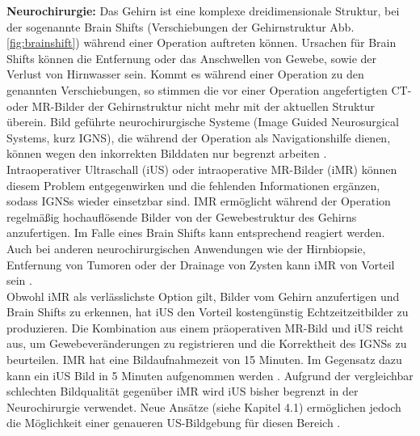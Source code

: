 \textbf{Neurochirurgie:}
Das Gehirn ist eine komplexe dreidimensionale Struktur, bei der sogenannte Brain Shifts (Verschiebungen der Gehirnstruktur Abb. \ref{fig:brainshift}) während einer Operation auftreten können. Ursachen für Brain Shifts können die Entfernung oder das Anschwellen von Gewebe, sowie der Verlust von Hirnwasser sein. Kommt es während einer Operation zu den genannten Verschiebungen, so stimmen die vor einer Operation angefertigten CT- oder MR-Bilder der Gehirnstruktur nicht mehr mit der aktuellen Struktur überein. Bild geführte neurochirurgische Systeme (Image Guided Neurosurgical Systems, kurz IGNS), die während der Operation als Navigationshilfe dienen, können wegen den inkorrekten Bilddaten nur begrenzt arbeiten \cite{BrainShiftInTumorResection}.\\
Intraoperativer Ultraschall (iUS) oder intraoperative MR-Bilder (iMR) können diesem Problem entgegenwirken und die fehlenden Informationen ergänzen, sodass IGNSs wieder einsetzbar sind. IMR ermöglicht während der Operation regelmäßig hochauflösende Bilder von der Gewebestruktur des Gehirns anzufertigen. Im Falle eines Brain Shifts kann entsprechend reagiert werden. Auch bei anderen neurochirurgischen Anwendungen wie der Hirnbiopsie, Entfernung von Tumoren oder der Drainage von Zysten kann iMR von Vorteil sein \cite{BrainShiftInTumorResection}.\\
Obwohl iMR als verlässlichste Option gilt, Bilder vom Gehirn anzufertigen und Brain Shifts zu erkennen, hat iUS den Vorteil kostengünstig Echtzeitzeitbilder zu produzieren. Die Kombination aus einem präoperativen MR-Bild und iUS reicht aus, um Gewebeveränderungen zu registrieren und die Korrektheit des IGNSs zu beurteilen. IMR hat eine Bildaufnahmezeit von 15 Minuten. Im Gegensatz dazu kann ein iUS Bild in 5 Minuten aufgenommen werden \cite{BrainShiftInTumorResection}. Aufgrund der vergleichbar schlechten Bildqualität gegenüber iMR wird iUS bisher begrenzt in der Neurochirurgie verwendet. Neue Ansätze (siehe Kapitel 4.1) ermöglichen jedoch die Möglichkeit einer genaueren US-Bildgebung für diesen Bereich \cite{BrainShiftInTumorResection}.

